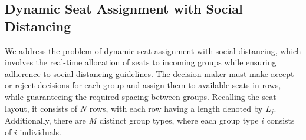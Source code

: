 




\subsection{Dynamic Seat Assignment with Social Distancing}\label{sec_dynamic}
We address the problem of dynamic seat assignment with social distancing, which involves the real-time allocation of seats to incoming groups while ensuring adherence to social distancing guidelines. The decision-maker must make accept or reject decisions for each group and assign them to available seats in rows, while guaranteeing the required spacing between groups. Recalling the seat layout, it consists of $N$ rows, with each row having a length denoted by $L_j$. Additionally, there are $M$ distinct group types, where each group type $i$ consists of $i$ individuals.



